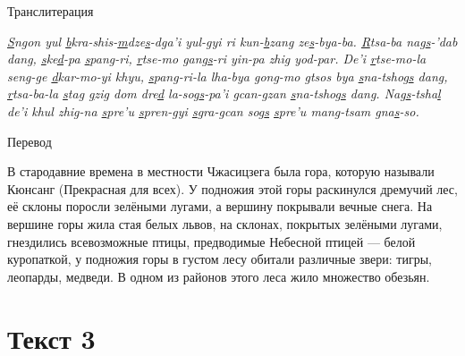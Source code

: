 \begin{center}Транслитерация\end{center}

\emph{\ul{S}ngon yul \ul{b}kra-shis-\ul{m}dze\ul{s}-dga'i yul-gyi ri kun-\ul{b}zang ze\ul{s}-bya-ba. \ul{R}tsa-ba nag\ul{s}-'dab dang, \ul{s}ke\ul{d}-pa \ul{s}pang-ri, \ul{r}tse-mo gang\ul{s}-ri yin-pa zhig yod-par.
De'i \ul{r}tse-mo-la seng-ge \ul{d}kar-mo-yi khyu, \ul{s}pang-ri-la lha-bya gong-mo \ul{g}tsos bya \ul{s}na-tshog\ul{s} dang, \ul{r}tsa-ba-la \ul{s}tag \ul{g}zig dom dre\ul{d} la-sog\ul{s}-pa'i \ul{g}can-\ul{g}zan \ul{s}na-tshog\ul{s} dang.
Nag\ul{s}-tsha\ul{l} de'i khul zhig-na \ul{s}pre'u \ul{s}pren-gyi \ul{s}gra-\ul{g}can sog\ul{s} \ul{s}pre'u mang-tsam gna\ul{s}-so.
}

\begin{center}Перевод\end{center}

В стародавние времена в местности Чжасицзега была гора, которую называли Кюнсанг (Прекрасная для всех). У подножия этой горы раскинулся дремучий лес, её склоны поросли зелёными лугами, а вершину покрывали вечные снега. На вершине горы жила стая белых львов, на склонах, покрытых зелёными лугами, гнездились всевозможные птицы, предводимые Небесной птицей --- белой куропаткой, у подножия горы в густом лесу обитали различные звери: тигры, леопарды, медведи. В одном из районов этого леса жило множество обезьян.

\section{Текст 3}


